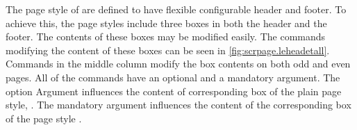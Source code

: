 %
%
%
%
%
%
%
%
%
The page style of  are defined to have flexible configurable
header and footer. To achieve this, the page styles include three boxes in
both the header and the footer. The contents of these boxes may be modified
easily. The commands modifying the content of these boxes can be seen in
\autoref{fig:scrpage.leheadetall}.  Commands in the middle column modify the
box contents on both odd and even pages. All of the commands have an optional
and a mandatory argument. The option Argument influences the content of
corresponding box of the plain page style, . The mandatory
argument influences the content of the corresponding box of the page style
.

